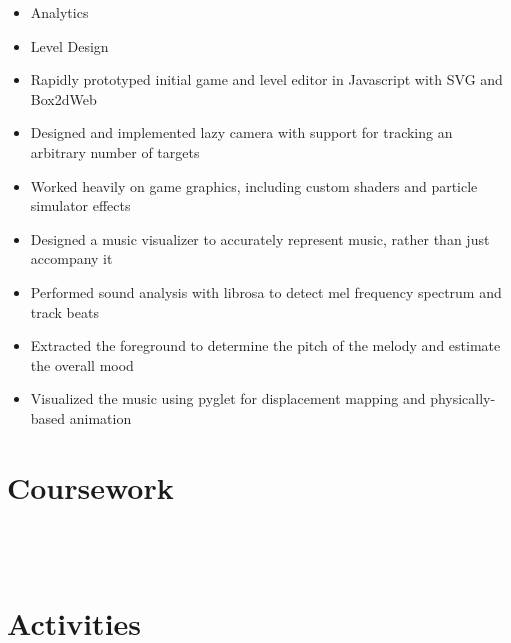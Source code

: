 \documentclass{zres}
\begin{document}
\begin{resume}
\begin{itemize}[leftmargin=10pt]
  \item Analytics
  \item Level Design
\end{itemize}

\begin{itemize}[leftmargin=10pt]
  \item Rapidly prototyped initial game and level editor in Javascript with SVG and Box2dWeb
  \item Designed and implemented lazy camera with support for tracking an arbitrary number of targets
  \item Worked heavily on game graphics, including custom shaders and particle simulator effects
\end{itemize}

\begin{itemize}[leftmargin=10pt]
  \item Designed a music visualizer to accurately represent music, rather than just accompany it
  \item Performed sound analysis with librosa to detect mel frequency spectrum and track beats
  \item Extracted the foreground to determine the pitch of the melody and estimate the overall mood
  \item Visualized the music using pyglet for displacement mapping and physically-based animation
\end{itemize}

\section{Coursework}

\\
\\

\section{Activities}


\end{resume}
\end{document}
